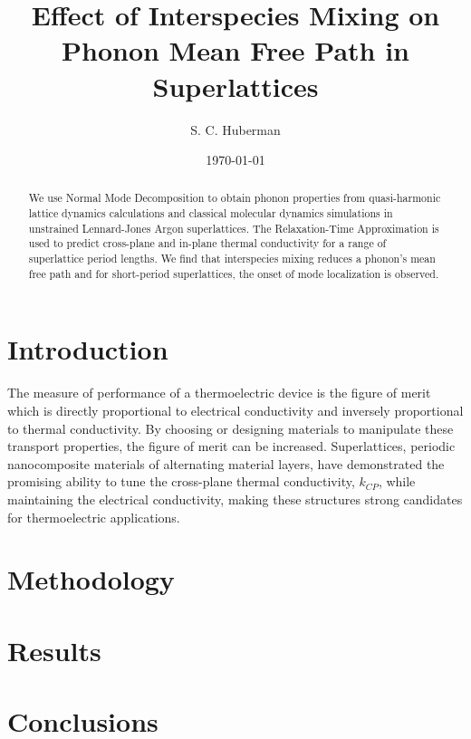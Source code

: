 \documentclass[aps,prb,preprint,preprintnumbers,amsmath,amssymb,floatfix,superscriptaddress]{revtex4}
\begin{document}
\title{Effect of Interspecies Mixing on Phonon Mean Free Path in Superlattices}

\author{S. C. Huberman}

\date{\today}%

\vspace{14mm}
  
\begin{abstract}

We use Normal Mode Decomposition to obtain phonon properties from quasi-harmonic lattice dynamics calculations and classical molecular dynamics simulations in unstrained Lennard-Jones Argon superlattices. The Relaxation-Time Approximation is used to predict cross-plane and in-plane thermal conductivity for a range of superlattice period lengths. We find that interspecies mixing reduces a phonon's mean free path and for short-period superlattices, the onset of mode localization is observed.

\end{abstract}
\maketitle

\section*{Introduction}
The measure of performance of a thermoelectric device is the figure of merit which is directly proportional to electrical conductivity and inversely proportional to thermal conductivity. By choosing or designing materials to manipulate these transport properties, the figure of merit can be increased. Superlattices, periodic nanocomposite materials of alternating material layers, have demonstrated the promising ability to tune the cross-plane thermal conductivity, $k_{CP}$, while maintaining the electrical conductivity, making these structures strong candidates for thermoelectric applications.

\section*{Methodology}

\section*{Results}

\section*{Conclusions}

\newpage
%

\end{document}
